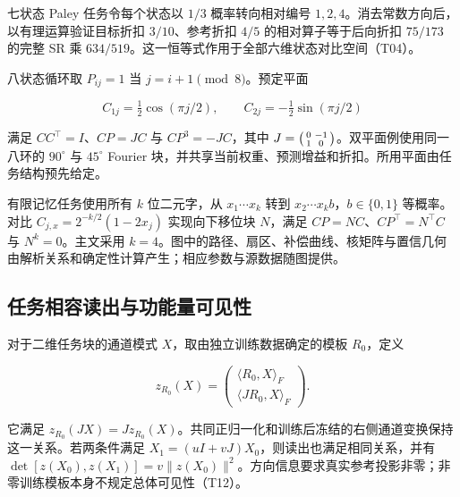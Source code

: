 \documentclass[11pt,a4paper]{article}
\begin{document}
七状态 Paley 任务令每个状态以 \(1/3\) 概率转向相对编号
\(1,2,4\)。消去常数方向后，以有理运算验证目标折扣 \(3/10\)、参考折扣
\(4/5\) 的相对算子等于后向折扣 \(75/173\) 的完整 SR 乘
\(634/519\)。这一恒等式作用于全部六维状态对比空间（T04）。

\par
\noindent\begin{minipage}{\linewidth}

八状态循环取 \(P_{ij}=1\) 当 \(j=i+1\pmod8\)。预定平面

\[
C_{1j}=\tfrac12\cos(\pi j/2),\qquad
C_{2j}=-\tfrac12\sin(\pi j/2)
\]

\end{minipage}\par

满足 \(CC^\top=I\)、\(CP=JC\) 与 \(CP^3=-JC\)，其中
\(J=\begin{psmallmatrix}0&-1\\1&0\end{psmallmatrix}\)。双平面例使用同一八环的
\(90^\circ\) 与 \(45^\circ\) Fourier
块，并共享当前权重、预测增益和折扣。所用平面由任务结构预先给定。

有限记忆任务使用所有 \(k\) 位二元字，从 \(x_1\cdots x_k\) 转到
\(x_2\cdots x_kb\)，\(b\in\{0,1\}\) 等概率。对比
\(C_{j,x}=2^{-k/2}(1-2x_j)\) 实现向下移位块 \(N\)，满足
\(CP=NC\)、\(CP^\top=N^\top C\) 与 \(N^k=0\)。主文采用
\(k=4\)。图中的路径、扇区、补偿曲线、核矩阵与置信几何由解析关系和确定性计算产生；相应参数与源数据随图提供。

\subsection{任务相容读出与功能量可见性}\label{ux4efbux52a1ux76f8ux5bb9ux8bfbux51faux4e0eux529fux80fdux91cfux53efux89c1ux6027}

\par
\noindent\begin{minipage}{\linewidth}

对于二维任务块的通道模式 \(X\)，取由独立训练数据确定的模板 \(R_0\)，定义

\[
z_{R_0}(X)=
\begin{pmatrix}
\langle R_0,X\rangle_F\\
\langle JR_0,X\rangle_F
\end{pmatrix}.
\]

\end{minipage}\par

它满足
\(z_{R_0}(JX)=Jz_{R_0}(X)\)。共同正归一化和训练后冻结的右侧通道变换保持这一关系。若两条件满足
\(X_1=(uI+vJ)X_0\)，则读出也满足相同关系，并有
\(\det[z(X_0),z(X_1)]=v\|z(X_0)\|^2\)。方向信息要求真实参考投影非零；非零训练模板本身不规定总体可见性（T12）。
\end{document}
